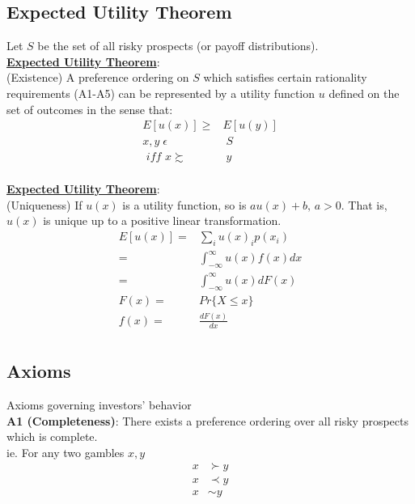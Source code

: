 \documentclass[
14pt,notheorems,hyperref={pdfauthor=whatever}
]{beamer}
\begin{document}
\subsection{Expected Utility Theorem}

\begin{frame}
Let $S$ be the set of all risky prospects (or payoff distributions).\\
\hfill \break
\underline{\textbf{Expected Utility Theorem}}:\\
\hfill\break
(Existence) A preference ordering on $S$ which satisfies certain rationality requirements (A1-A5) can be represented by a utility function $u$ defined on the set of outcomes in the sense that:\\
\begin{align*}
    E[u(x)] \geq& E[u(y)]\\
    x, y \; \epsilon& \; S\\
    \textit{ iff } x \succsim & \; y\\
\end{align*}
\end{frame}

\begin{frame}
\underline{\textbf{Expected Utility Theorem}}:\\
\hfill\break
(Uniqueness) If $u(x)$ is a utility function, so is $au(x)+b\textit{, }a>0$. That is, $u(x)$ is unique up to a positive linear transformation. \\
\begin{align*}
    E[u(x)] =& \sum_i u(x)_i p(x_i)\\
    =& \int_{-\infty}^\infty u(x)f(x)dx\\
    =& \int_{-\infty}^\infty u(x)dF(x)\\
    F(x) =& Pr\{X \leq x\}\\
    f(x) =& \frac{dF(x)}{dx}\\
\end{align*}
\end{frame}

\subsection{Axioms}

\begin{frame}
Axioms governing investors' behavior\\
\hfill \break
\textbf{A1 (Completeness)}: There exists a preference ordering over all risky prospects which is complete.\\
\hfill \break
ie. For any two gambles $x,y$
\hfill \break
\begin{align*}
    x &\succ y\\
    x &\prec y\\
    x &\sim y\\
\end{align*}
\end{frame}
\end{document}
